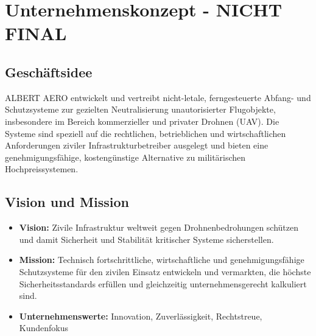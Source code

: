 \documentclass[11pt,a4paper]{article}
\begin{document}

\section{Unternehmenskonzept - NICHT FINAL}

\subsection{Geschäftsidee}
ALBERT AERO entwickelt und vertreibt nicht-letale, ferngesteuerte Abfang- und Schutzsysteme 
zur gezielten Neutralisierung unautorisierter Flugobjekte, insbesondere im Bereich kommerzieller 
und privater Drohnen (UAV). Die Systeme sind speziell auf die rechtlichen, betrieblichen und 
wirtschaftlichen Anforderungen ziviler Infrastrukturbetreiber ausgelegt und bieten eine 
genehmigungsfähige, kostengünstige Alternative zu militärischen Hochpreissystemen.

\subsection{Vision und Mission}
\begin{itemize}
    \item \textbf{Vision:} Zivile Infrastruktur weltweit gegen Drohnenbedrohungen schützen und damit 
    Sicherheit und Stabilität kritischer Systeme sicherstellen.
    \item \textbf{Mission:} Technisch fortschrittliche, wirtschaftliche und genehmigungsfähige 
    Schutzsysteme für den zivilen Einsatz entwickeln und vermarkten, die höchste Sicherheitsstandards 
    erfüllen und gleichzeitig unternehmensgerecht kalkuliert sind.
    \item \textbf{Unternehmenswerte:} Innovation, Zuverlässigkeit, Rechtstreue, Kundenfokus
\end{itemize}
\end{document}
